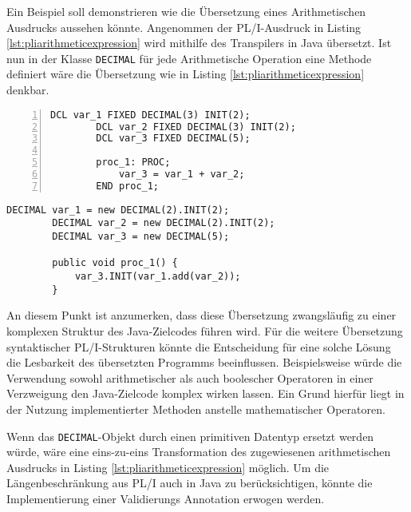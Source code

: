 Ein Beispiel soll demonstrieren wie die Übersetzung eines Arithmetischen Ausdrucks aussehen könnte.
Angenommen der PL/I-Ausdruck in Listing \ref{lst:pliarithmeticexpression} wird mithilfe des Transpilers in Java übersetzt.
Ist nun in der Klasse \verb+DECIMAL+ für jede Arithmetische Operation eine Methode definiert wäre die Übersetzung wie in Listing \ref{lst:pliarithmeticexpression} denkbar.

\begin{minipage}[b]{0.5\linewidth}
	\centering
	\lstset{language=PL/I,label=SliceExaple}
	\begin{lstlisting}[frame=single, numbers=left, mathescape,%
		caption={Transformation DECIMAL}, label={lst:pliarithmeticexpression}]
		DCL var_1 FIXED DECIMAL(3) INIT(2);
		DCL var_2 FIXED DECIMAL(3) INIT(2);
		DCL var_3 FIXED DECIMAL(5);
		
		proc_1: PROC;
			var_3 = var_1 + var_2;
		END proc_1;
	\end{lstlisting}
\end{minipage}
\hspace{0.5cm}
\begin{minipage}[b]{0.5\linewidth}
	\centering
	\lstset{language=Java,label=SliceExaple}
	\begin{lstlisting}[frame=single, mathescape,%
		title={}]
		DECIMAL var_1 = new DECIMAL(2).INIT(2);
		DECIMAL var_2 = new DECIMAL(2).INIT(2);
		DECIMAL var_3 = new DECIMAL(5);
		
		public void proc_1() {
			var_3.INIT(var_1.add(var_2));
		}
	\end{lstlisting}
\end{minipage}

An diesem Punkt ist anzumerken, dass diese Übersetzung zwangsläufig zu einer komplexen Struktur des Java-Zielcodes führen wird. Für die weitere Übersetzung syntaktischer PL/I-Strukturen könnte die Entscheidung für eine solche Lösung die Lesbarkeit des übersetzten Programms beeinflussen. Beispielsweise würde die Verwendung sowohl arithmetischer als auch boolescher Operatoren in einer Verzweigung den Java-Zielcode komplex wirken lassen. Ein Grund hierfür liegt in der Nutzung implementierter Methoden anstelle mathematischer Operatoren.

Wenn das \verb+DECIMAL+-Objekt durch einen primitiven Datentyp ersetzt werden würde, wäre eine eins-zu-eins Transformation des zugewiesenen arithmetischen Ausdrucks in Listing \ref{lst:pliarithmeticexpression} möglich. Um die Längenbeschränkung aus PL/I auch in Java zu berücksichtigen, könnte die Implementierung einer Validierungs Annotation erwogen werden.

